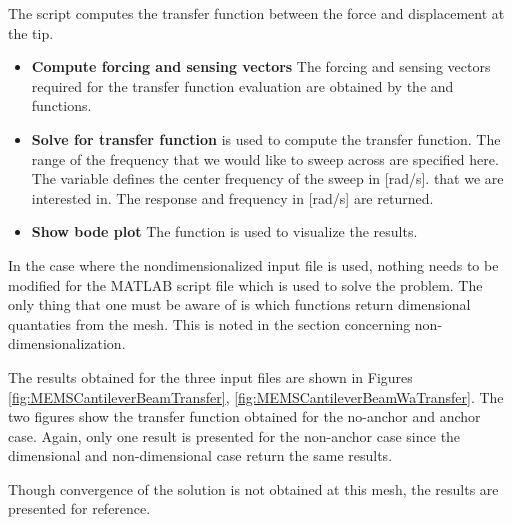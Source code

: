 \clearpage
The script computes the transfer function between the force and 
displacement at the tip.

\begin{itemize}

  \item{\textbf{Compute forcing and sensing vectors}}
  The forcing and sensing vectors required for the transfer function 
  evaluation are obtained by the  and 
   functions.

  \item{\textbf{Solve for transfer function}}
   is used to compute the transfer function.
  The range of the frequency that we would like to sweep across are 
  specified here. The variable  defines the center frequency 
  of the sweep in [rad/s]. that we are interested in. The response and 
  frequency in [rad/s] are returned.

  \item{\textbf{Show bode plot}}
  The function  is used to visualize the results.

\end{itemize}

In the case where the nondimensionalized input file is used, nothing 
needs to be modified for the MATLAB script file which is used to solve 
the problem. The only thing that one must be aware of is which functions 
return dimensional quantaties from the mesh. This is noted in the 
section concerning non-dimensionalization.

The results obtained for the three input files are shown in 
Figures 
\ref{fig:MEMSCantileverBeamTransfer},
\ref{fig:MEMSCantileverBeamWaTransfer}.
The two figures show the transfer function obtained for
the no-anchor and anchor case.
Again, only one result is presented for the non-anchor case since
the dimensional and non-dimensional case return the same 
results. 

Though convergence of the solution is not obtained at this
mesh, the results are presented for reference.

